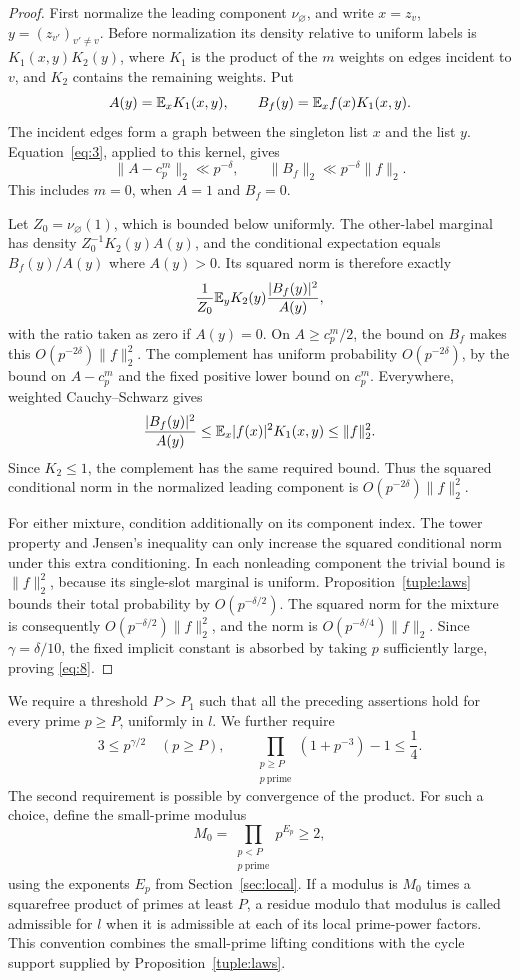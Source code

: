 \begin{proof}
First normalize the leading component $\nu_{\varnothing}$, and
write $x=z_v$, $y=(z_{v'})_{v'\ne v}$.  Before normalization its
density relative to uniform labels is $K_1(x,y)K_2(y)$, where $K_1$
is the product of the $m$ weights on edges incident to $v$, and
$K_2$ contains the remaining weights.  Put
\[
 A(y)=\mathbb E_xK_1(x,y),\qquad
 B_f(y)=\mathbb E_x f(x)K_1(x,y).
\]
The incident edges form a graph between the singleton list $x$ and
the list $y$.  Equation~\eqref{eq:3}, applied to this kernel, gives
\[
 \|A-c_p^m\|_2\ll p^{-\delta},\qquad
 \|B_f\|_2\ll p^{-\delta}\|f\|_2.
\]
This includes $m=0$, when $A=1$ and $B_f=0$.

Let $Z_0=\nu_{\varnothing}(1)$, which is bounded below uniformly.
The other-label marginal has density $Z_0^{-1}K_2(y)A(y)$, and the
conditional expectation equals $B_f(y)/A(y)$ where $A(y)>0$.
Its squared norm is therefore exactly
\[
 \frac1{Z_0}\mathbb E_y K_2(y)\frac{|B_f(y)|^2}{A(y)},
\]
with the ratio taken as zero if $A(y)=0$.  On $A\ge c_p^m/2$, the
bound on $B_f$ makes this $O(p^{-2\delta})\|f\|_2^2$.  The
complement has uniform probability $O(p^{-2\delta})$, by the bound
on $A-c_p^m$ and the fixed positive lower bound on $c_p^m$.
Everywhere, weighted Cauchy--Schwarz gives
\[
 \frac{|B_f(y)|^2}{A(y)}
       \le\mathbb E_x |f(x)|^2K_1(x,y)\le\|f\|_2^2.
\]
Since $K_2\le1$, the complement has the same required bound.  Thus
the squared conditional norm in the normalized leading component is
$O(p^{-2\delta})\|f\|_2^2$.

For either mixture, condition additionally on its component index.
The tower property and Jensen's inequality can only increase the
squared conditional norm under this extra conditioning.  In each
nonleading component the trivial bound is $\|f\|_2^2$, because its
single-slot marginal is uniform.  Proposition~\ref{tuple:laws} bounds
their total probability by $O(p^{-\delta/2})$.  The squared norm for
the mixture is consequently $O(p^{-\delta/2})\|f\|_2^2$, and the
norm is $O(p^{-\delta/4})\|f\|_2$.  Since $\gamma=\delta/10$, the
fixed implicit constant is absorbed by taking $p$ sufficiently large,
proving \eqref{eq:8}.
\end{proof}

We require a threshold $P>P_1$ such that all the preceding
assertions hold for every prime $p\ge P$, uniformly in $l$.  We
further require
\begin{equation}
 3\le p^{\gamma/2}\quad(p\ge P),\qquad
 \prod_{\substack{p\ge P\\p\ \mathrm{prime}}}(1+p^{-3})-1
       \le\frac14.
 \label{eq:9}
\end{equation}
The second requirement is possible by convergence of the product.
For such a choice, define the small-prime modulus
\[
 M_0=\prod_{\substack{p<P\\p\ \mathrm{prime}}}p^{E_p}\ge2,
\]
using the exponents $E_p$ from Section~\ref{sec:local}.  If a modulus
is $M_0$ times a squarefree product of primes at least $P$, a residue
modulo that modulus is called admissible for $l$ when it is admissible
at each of its local prime-power factors.  This convention combines
the small-prime lifting conditions with the cycle support supplied
by Proposition~\ref{tuple:laws}.

